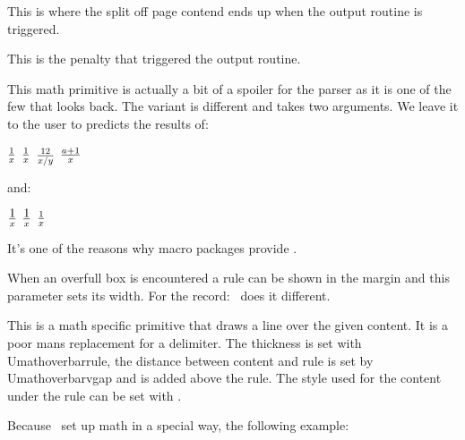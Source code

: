 \startnewprimitive[title={\prm {outputbox}}]

This is where the split off page contend ends up when the output routine is
triggered.

\stopnewprimitive

\startoldprimitive[title={\prm {outputpenalty}}]

This is the penalty that triggered the output routine.

\stopoldprimitive

\startoldprimitive[title={\prm {over}}][obsolete=yes]

This math primitive is actually a bit of a spoiler for the parser as it is one of
the few that looks back. The  variant is different and takes two
arguments. We leave it to the user to predicts the results of:

\starttyping
$    {1} \over {x}    $
$     1  \over  x     $
$    12  \over  x / y $
$ a + 1  \over {x}    $
\stoptyping

and:

\starttyping
$  \textstyle 1  \over x  $
$ {\textstyle 1} \over x  $
$  \textstyle {1 \over x} $
\stoptyping

It's one of the reasons why macro packages provide \type {\frac}.

\stopoldprimitive

\startoldprimitive[title={\prm {overfullrule}}]

When an overfull box is encountered a rule can be shown in the margin and this
parameter sets its width. For the record: \CONTEXT\ does it different.

\stopoldprimitive

\startoldprimitive[title={\prm {overline}}]

This is a math specific primitive that draws a line over the given content. It is
a poor mans replacement for a delimiter. The thickness is set with \prm
{Umathoverbarrule}, the distance between content and rule is set by \prm
{Umathoverbarvgap} and  is added above the rule. The style
used for the content under the rule can be set with .

Because \CONTEXT\ set up math in a special way, the following example:

\startbuffer[demo]
\stopbuffer

